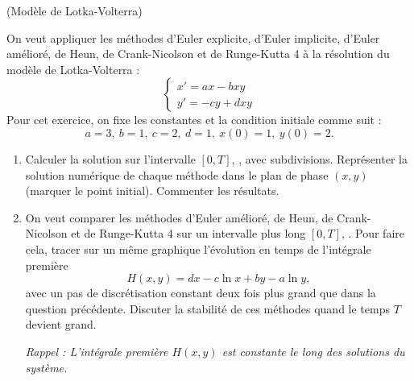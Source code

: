 \documentclass[a4paper,12pt,reqno]{amsart}
\begin{document}
\begin{exo} (Modèle de Lotka-Volterra)

  On veut appliquer les méthodes d'Euler explicite, d'Euler implicite, d'Euler amélioré, de Heun, de Crank-Nicolson et de Runge-Kutta 4
  à la résolution du modèle de Lotka-Volterra :
    $$
      \begin{cases}
        x' =ax-bxy\\
        y' =-cy+dxy
      \end{cases}
    $$
  Pour cet exercice, on fixe les constantes et la condition initiale comme suit :
    $$
    a=3,\ b=1,\ c=2,\ d=1,\ x(0)=1,\ y(0)=2.
    $$
  \begin{enumerate}
    \item Calculer la solution sur l'intervalle $[0,T]$, , avec  subdivisions. Représenter la solution numérique de chaque méthode dans le plan de phase $(x,y)$ (marquer le point initial). Commenter les résultats.
    \item On veut comparer les méthodes d'Euler amélioré, de Heun, de Crank-Nicolson et de Runge-Kutta 4 sur un intervalle plus long $[0,T]$, . Pour faire cela, tracer sur un même graphique l'évolution en temps de l'intégrale première
      $$
        H(x,y) = dx -c \ln x + by -a \ln y,
      $$
    avec un pas de discrétisation constant deux fois plus grand que dans la question précédente. Discuter la stabilité de ces méthodes quand le temps $T$ devient grand.

    \textit{Rappel : L'intégrale première $H(x,y)$ est constante le long des solutions du système.}
  \end{enumerate}
\end{exo}
\end{document}
